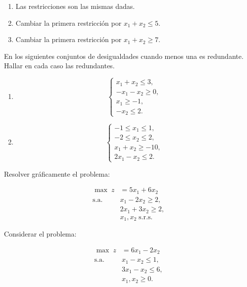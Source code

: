 \begin{Ejer}
\begin{Ejer}
\begin{enumerate}
\item[a)] Las restricciones son las mismas dadas.
\item[b)] Cambiar la primera restricci\'on por $x_1 + x_2 \le 5$.
\item[c)] Cambiar la primera restricci\'on por $x_1 + x_2 \ge 7$.
\end{enumerate}

\end{Ejer}

\begin{Ejer}
En los siguientes conjuntos de desigualdades cuando menos una es redundante. Hallar en cada caso las redundantes.

\begin{enumerate}
\item
\[
\begin{cases}
x_1 + x_2 \leq 3, \\
- x_1 - x_2 \geq 0, \\
x_1 \geq -1, \\
- x_2 \leq 2.
\end{cases}
\]

\item
\[
\begin{cases}
-1 \leq x_1 \leq 1, \\
-2 \leq x_2 \leq 2, \\
x_1 + x_2 \geq -10, \\
2x_1 - x_2 \leq 2.
\end{cases}
\]
\end{enumerate}
\end{Ejer}

\begin{Ejer}
Resolver gr\'aficamente el problema:

\[
\begin{aligned}
\max \; z &= 5x_1 + 6x_2 \\
\text{s.a.} \quad
& x_1 - 2x_2 \geq 2, \\
& 2x_1 + 3x_2 \geq 2, \\
& x_1, x_2 \; \text{s.r.s.}
\end{aligned}
\]
\end{Ejer}

\begin{Ejer}
Considerar el problema:

\[
\begin{aligned}
\max \; z &= 6x_1 - 2x_2 \\
\text{s.a.} \quad
& x_1 - x_2 \leq 1, \\
& 3x_1 - x_2 \leq 6, \\
& x_1, x_2 \geq 0.
\end{aligned}
\]


\end{Ejer}
\end{Ejer}
